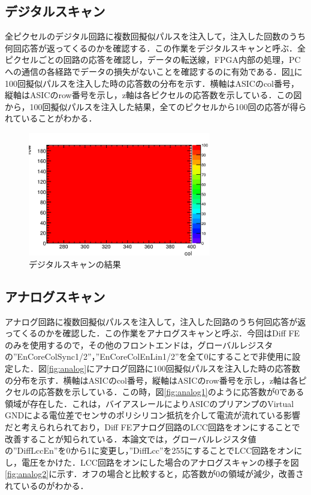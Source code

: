\subsection{デジタルスキャン}
全ピクセルのデジタル回路に複数回擬似パルスを注入して，注入した回数のうち何回応答が返ってくるのかを確認する．この作業をデジタルスキャンと呼ぶ．全ピクセルごとの回路の応答を確認し，データの転送線，FPGA内部の処理，PCへの通信の各経路でデータの損失がないことを確認するのに有効である．図\ref{fig:digital}に100回擬似パルスを注入した時の応答数の分布を示す．横軸はASICのcol番号，縦軸はASICのrow番号を示し，z軸は各ピクセルの応答数を示している．この図から，100回擬似パルスを注入した結果，全てのピクセルから100回の応答が得られていることがわかる．
\begin{figure}[h]
  \centering
  \includegraphics[width=8cm]{./figure/DigitalScan.png}
  \caption{デジタルスキャンの結果}
  \label{fig:digital}
\end{figure}


\subsection{アナログスキャン}
アナログ回路に複数回擬似パルスを注入して，注入した回路のうち何回応答が返ってくるのかを確認した．この作業をアナログスキャンと呼ぶ．今回はDiff FEのみを使用するので，その他のフロントエンドは，グローバルレジスタの''EnCoreColSync1/2''，''EnCoreColEnLin1/2''を全て0にすることで非使用に設定した．図\ref{fig:analog}にアナログ回路に100回擬似パルスを注入した時の応答数の分布を示す．横軸はASICのcol番号，縦軸はASICのrow番号を示し，z軸は各ピクセルの応答数を示している．この時，図\ref{fig:analog1}のように応答数が0である領域が存在した．これは，バイアスレールによりASICのプリアンプのVirtual GNDによる電位差でセンサのポリシリコン抵抗を介して電流が流れている影響だと考えられられており，Diff FEアナログ回路のLCC回路をオンにすることで改善することが知られている．本論文では，グローバルレジスタ値の''DiffLccEn''を0から1に変更し，''DiffLcc''を255にすることでLCC回路をオンにし，電圧をかけた．LCC回路をオンにした場合のアナログスキャンの様子を図\ref{fig:analog2}に示す．オフの場合と比較すると，応答数が0の領域が減少，改善されているのがわかる．

